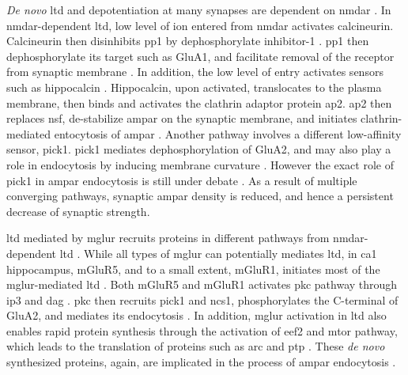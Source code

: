 \textit{De novo} \gls{ltd} and depotentiation at many synapses are dependent on \gls{nmdar} \citep{collingridge83, dudek92}. In \gls{nmdar}-dependent \gls{ltd}, low level of  ion entered from \gls{nmdar} activates calcineurin. Calcineurin then disinhibits \gls{pp1} by dephosphorylate inhibitor-1 \citep{mulkey93}. \Gls{pp1} then dephosphorylate its target such as GluA1, and facilitate removal of the receptor from synaptic membrane \citep{collingridge04}. In addition, the low level of  entry activates  sensors such as hippocalcin \citep{palmer05}. Hippocalcin, upon activated, translocates to the plasma membrane, then binds and activates the clathrin adaptor protein \gls{ap2}. \Gls{ap2} then replaces \gls{nsf}, de-stabilize \gls{ampar} on the synaptic membrane, and initiates clathrin-mediated entocytosis of \gls{ampar} \citep{collingridge04, palmer05}. Another pathway involves a different low-affinity  sensor, \gls{pick1}. \Gls{pick1} mediates dephosphorylation of GluA2, and may also play a role in endocytosis by inducing membrane curvature \citep{collingridge04, lin07}. However the exact role of \gls{pick1} in \gls{ampar} endocytosis is still under debate \citep{collingridge10}. As a result of multiple converging pathways, synaptic \gls{ampar} density is reduced, and hence a persistent decrease of synaptic strength.

\Gls{ltd} mediated by \gls{mglur} recruits proteins in different pathways from \gls{nmdar}-dependent \gls{ltd} \citep{gladding09}. While all types of \gls{mglur} can potentially mediates \gls{ltd}, in \gls{ca1} hippocampus, mGluR5, and to a small extent, mGluR1, initiates most of the \gls{mglur}-mediated \gls{ltd} \citep{luscher10}. Both mGluR5 and mGluR1 activates \gls{pkc} pathway through \gls{ip3} and \gls{dag} \citep{oliet97}. \Gls{pkc} then recruits \gls{pick1} and \gls{ncs1}, phosphorylates the C-terminal of GluA2, and mediates its endocytosis \citep{bellone06, jo08}. In addition, \gls{mglur} activation in \gls{ltd} also enables rapid protein synthesis through the activation of \gls{eef2} and \gls{mtor} pathway, which leads to the translation of proteins such as \gls{arc} and \gls{ptp} \citep{park08, zhang08}. These \textit{de novo} synthesized proteins, again, are implicated in the process of \gls{ampar} endocytosis \citep{collingridge10}.

